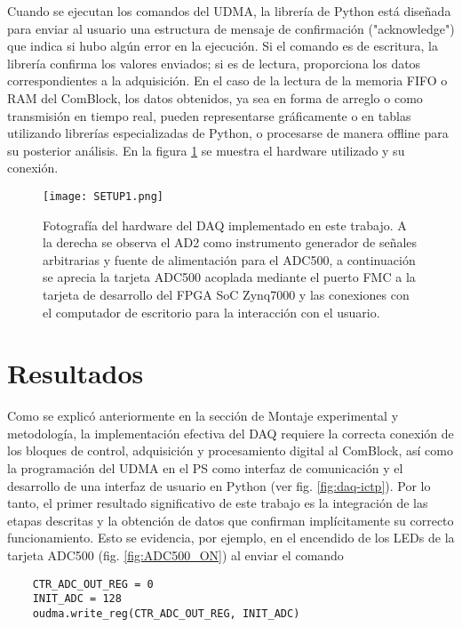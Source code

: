 \documentclass{report}
\begin{document}
\noindent Cuando se ejecutan los comandos del UDMA, la librería de Python está diseñada para enviar al usuario una estructura de mensaje de confirmación ("acknowledge") que indica si hubo algún error en la ejecución. Si el comando es de escritura, la librería confirma los valores enviados; si es de lectura, proporciona los datos correspondientes a la adquisición. En el caso de la lectura de la memoria FIFO o RAM del ComBlock, los datos obtenidos, ya sea en forma de arreglo o como transmisión en tiempo real, pueden representarse gráficamente o en tablas utilizando librerías especializadas de Python, o procesarse de manera offline para su posterior análisis. En la figura \ref{fig:setup1} se muestra el hardware utilizado y su conexión.

\begin{figure}[H]
    \centering
    \texttt{[image: SETUP1.png]}
    \caption{Fotografía del hardware del DAQ implementado en este trabajo. A la derecha se observa el AD2 como instrumento generador de señales arbitrarias y fuente de alimentación para el ADC500, a continuación se aprecia la tarjeta ADC500 acoplada mediante el puerto FMC a la tarjeta de desarrollo del FPGA SoC Zynq7000 y las conexiones con el computador de escritorio para la interacción con el usuario.}
    \label{fig:setup1}
\end{figure}

\newpage

\section{Resultados}

\noindent Como se explicó anteriormente en la sección de Montaje experimental y metodología, la implementación efectiva del DAQ requiere la correcta conexión de los bloques de control, adquisición y procesamiento digital al ComBlock, así como la programación del UDMA en el PS como interfaz de comunicación y el desarrollo de una interfaz de usuario en Python (ver fig. \ref{fig:daq-ictp}). Por lo tanto, el primer resultado significativo de este trabajo es la integración de las etapas descritas y la obtención de datos que confirman implícitamente su correcto funcionamiento. Esto se evidencia, por ejemplo, en el encendido de los LEDs de la tarjeta ADC500 (fig. \ref{fig:ADC500_ON}) al enviar el comando  

\begin{verbatim}
    CTR_ADC_OUT_REG = 0
    INIT_ADC = 128
    oudma.write_reg(CTR_ADC_OUT_REG, INIT_ADC)
\end{verbatim}
 
\end{document}
